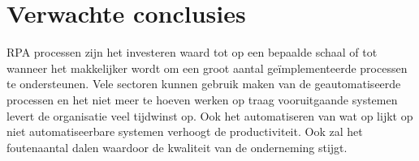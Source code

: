 \section{Verwachte conclusies}
\label{sec:verwachte_conclusies}
RPA processen zijn het investeren waard tot op een bepaalde schaal of tot wanneer het makkelijker wordt om een groot aantal geïmplementeerde processen te ondersteunen. Vele sectoren kunnen gebruik maken van de geautomatiseerde processen en het niet meer te hoeven werken op traag vooruitgaande systemen levert de organisatie veel tijdwinst op. Ook het automatiseren van wat op lijkt op niet automatiseerbare systemen verhoogt de productiviteit. Ook zal het foutenaantal dalen waardoor de kwaliteit van de onderneming stijgt.

